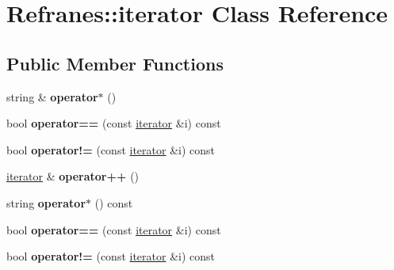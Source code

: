 \hypertarget{class_refranes_1_1iterator}{}\section{Refranes\+:\+:iterator Class Reference}
\label{class_refranes_1_1iterator}
\subsection*{Public Member Functions}
\begin{DoxyCompactItemize}
\item 
string \& {\bfseries operator$\ast$} ()\hypertarget{class_refranes_1_1iterator_a86dc057bc5799bfcf23ac180e83005b5}{}\label{class_refranes_1_1iterator_a86dc057bc5799bfcf23ac180e83005b5}

\item 
bool {\bfseries operator==} (const \hyperlink{class_refranes_1_1iterator}{iterator} \&i) const \hypertarget{class_refranes_1_1iterator_adf86c1dae3556359dc9f74de07de91d1}{}\label{class_refranes_1_1iterator_adf86c1dae3556359dc9f74de07de91d1}

\item 
bool {\bfseries operator!=} (const \hyperlink{class_refranes_1_1iterator}{iterator} \&i) const \hypertarget{class_refranes_1_1iterator_af50d81b68c4d819db19b3bbc7227462a}{}\label{class_refranes_1_1iterator_af50d81b68c4d819db19b3bbc7227462a}

\item 
\hyperlink{class_refranes_1_1iterator}{iterator} \& {\bfseries operator++} ()\hypertarget{class_refranes_1_1iterator_a85435f7275a2f1ee731385fa835d68c7}{}\label{class_refranes_1_1iterator_a85435f7275a2f1ee731385fa835d68c7}

\item 
string {\bfseries operator$\ast$} () const \hypertarget{class_refranes_1_1iterator_a6c6d211bb5a68165548095f2a5e8fed2}{}\label{class_refranes_1_1iterator_a6c6d211bb5a68165548095f2a5e8fed2}

\item 
bool {\bfseries operator==} (const \hyperlink{class_refranes_1_1iterator}{iterator} \&i) const \hypertarget{class_refranes_1_1iterator_adf86c1dae3556359dc9f74de07de91d1}{}\label{class_refranes_1_1iterator_adf86c1dae3556359dc9f74de07de91d1}

\item 
bool {\bfseries operator!=} (const \hyperlink{class_refranes_1_1iterator}{iterator} \&i) const \hypertarget{class_refranes_1_1iterator_af50d81b68c4d819db19b3bbc7227462a}{}\label{class_refranes_1_1iterator_af50d81b68c4d819db19b3bbc7227462a}


\end{DoxyCompactItemize}
